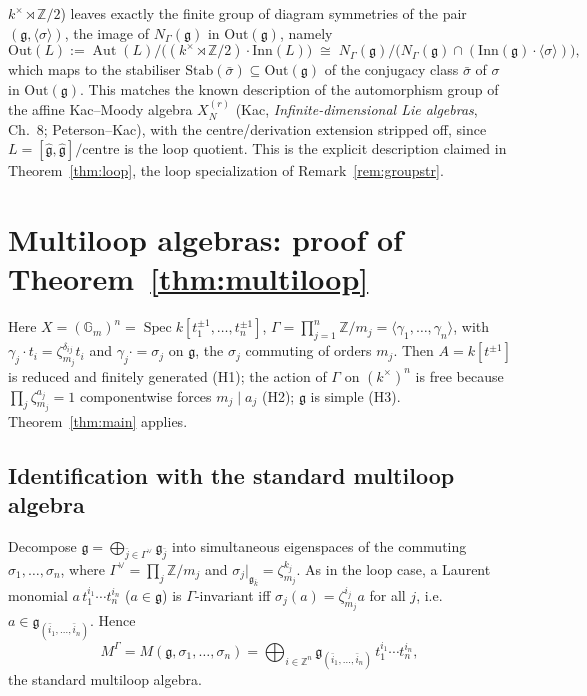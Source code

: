 \documentclass{amsart}
\theoremstyle{definition}
\DeclareMathOperator{\Aut}{Aut}
\DeclareMathOperator{\Spec}{Spec}
\newcommand{\Gm}{\mathbb{G}_m}
\newcommand{\g}{\mathfrak{g}}
\newcommand{\Z}{\mathbb{Z}}
\newcommand{\M}{M}
\begin{document}
$k^\times\rtimes\Z/2$) leaves exactly the finite group of diagram symmetries
of the pair $(\g,\langle\sigma\rangle)$, the image of $N_\Gamma(\g)$ in
$\mathrm{Out}(\g)$, namely
\[
\mathrm{Out}(L):=\Aut(L)/\bigl((k^\times\rtimes\Z/2)\cdot\mathrm{Inn}(L)\bigr)
\;\cong\;N_\Gamma(\g)\big/\bigl(N_\Gamma(\g)\cap
(\mathrm{Inn}(\g)\!\cdot\!\langle\sigma\rangle)\bigr),
\]
which maps to the stabiliser
$\mathrm{Stab}(\bar\sigma)\subseteq\mathrm{Out}(\g)$ of the conjugacy class
$\bar\sigma$ of $\sigma$ in $\mathrm{Out}(\g)$.  This matches the known
description of the automorphism group of the affine Kac--Moody algebra
$X_N^{(r)}$ (Kac, \emph{Infinite-dimensional Lie algebras}, Ch.~8;
Peterson--Kac), with the centre/derivation extension stripped off, since
$L=[\hat{\mathfrak g},\hat{\mathfrak g}]/\text{centre}$ is the loop
quotient.  This is the explicit description claimed in
Theorem~\ref{thm:loop}, the loop specialization of
Remark~\ref{rem:groupstr}.

\section{Multiloop algebras: proof of Theorem~\ref{thm:multiloop}}
\label{sec:multiloop}

Here $X=(\Gm)^n=\Spec k[t_1^{\pm1},\dots,t_n^{\pm1}]$,
$\Gamma=\prod_{j=1}^n\Z/m_j=\langle\gamma_1,\dots,\gamma_n\rangle$, with
$\gamma_j\cdot t_i=\zeta_{m_j}^{\delta_{ij}}t_i$ and $\gamma_j\cdot=
\sigma_j$ on $\g$, the $\sigma_j$ commuting of orders $m_j$.  Then
$A=k[t^{\pm1}]$ is reduced and finitely generated (H1); the action of
$\Gamma$ on $(k^\times)^n$ is free because $\prod_j\zeta_{m_j}^{a_j}=1$
componentwise forces $m_j\mid a_j$ (H2); $\g$ is simple (H3).
Theorem~\ref{thm:main} applies.

\subsection{Identification with the standard multiloop algebra}
Decompose $\g=\bigoplus_{\bar j\in\Gamma^\vee}\g_{\bar j}$ into
simultaneous eigenspaces of the commuting $\sigma_1,\dots,\sigma_n$, where
$\Gamma^\vee=\prod_j\Z/m_j$ and $\sigma_j|_{\g_{\bar k}}=
\zeta_{m_j}^{k_j}$.  As in the loop case, a Laurent monomial
$a\,t_1^{i_1}\cdots t_n^{i_n}$ ($a\in\g$) is $\Gamma$-invariant iff
$\sigma_j(a)=\zeta_{m_j}^{i_j}a$ for all $j$, i.e.\
$a\in\g_{(\bar i_1,\dots,\bar i_n)}$.  Hence
\[
\M^\Gamma=M(\g,\sigma_1,\dots,\sigma_n)
=\bigoplus_{i\in\Z^n}\g_{(\bar i_1,\dots,\bar i_n)}\,t_1^{i_1}\cdots
t_n^{i_n},
\]
the standard multiloop algebra.
\end{document}
